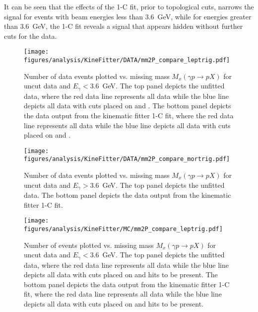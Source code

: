 It can be seen that the effects of the 1-C fit, prior to topological cuts, narrows the \pizT signal for events with beam energies less than 3.6~GeV, while for energies greater than 3.6~GeV, the 1-C fit reveals a signal that appears hidden without further cuts for the data.
\begin{figure}[h!]\begin{center}
\texttt{[image: \\figures/analysis/KineFitter/DATA/mm2P\_compare\_leptrig.pdf]}
\caption[Number of data events plotted vs. missing mass $M_x(\gamma p \to p X)$ for uncut data and $E_\gamma < 3.6$~GeV]{\label{fig:kinfit.effect_lep}Number of data events plotted vs. missing mass $M_x(\gamma p \to p X)$ for uncut data and $E_\gamma < 3.6$~GeV. The top panel depicts the unfitted data, where the red data line represents all data while the blue line depicts all data with cuts placed on  and . The bottom panel depicts the data output from the kinematic fitter 1-C fit, where the red data line represents all data while the blue line depicts all data with cuts placed on  and .  }
\end{center}\end{figure}

\begin{figure}[h!]\begin{center}
\texttt{[image: \\figures/analysis/KineFitter/DATA/mm2P\_compare\_mortrig.pdf]}
\caption[Number of data events plotted vs. missing mass $M_x(\gamma p \to p X)$ for uncut data and $E_\gamma > 3.6$~GeV]{\label{fig:kinfit.effect_mor}Number of data events plotted vs. missing mass $M_x(\gamma p \to p X)$ for uncut data and $E_\gamma > 3.6$~GeV. The top panel depicts the unfitted data. The bottom panel depicts the data output from the kinematic fitter 1-C fit.}
\end{center}\end{figure}

\begin{figure}[h!]\begin{center}
\texttt{[image: \\figures/analysis/KineFitter/MC/mm2P\_compare\_leptrig.pdf]}
\caption[Number of  events plotted vs. missing mass $M_x(\gamma p \to p X)$ for uncut data and $E_\gamma < 3.6$~GeV]{\label{fig:kinfit.effect_lepMC}Number of  events plotted vs. missing mass $M_x(\gamma p \to p X)$ for uncut data and $E_\gamma < 3.6$~GeV. The top panel depicts the unfitted data, where the red data line represents all data while the blue line depicts all data with cuts placed on  and  hits to be present. The bottom panel depicts the data output from the kinematic fitter 1-C fit, where the red data line represents all data while the blue line depicts all data with cuts placed on  and  hits to be present.  }
\end{center}\end{figure}

